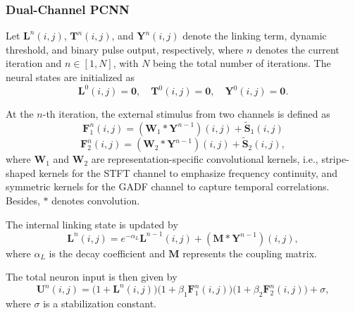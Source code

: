 \documentclass[pdflatex,sn-mathphys-num]{sn-jnl}
\theoremstyle{thmstyleone}%
\theoremstyle{thmstyletwo}%
\theoremstyle{thmstylethree}%
\begin{document}
\subsubsection{Dual-Channel PCNN}

Let $\boldsymbol{L}^n(i,j)$, $\boldsymbol{T}^n(i,j)$, and $\boldsymbol{Y}^n(i,j)$ denote the linking term, dynamic threshold, and binary pulse output, respectively, where $n$ denotes the current iteration and $n \in [1, N]$, with $N$ being the total number of iterations. The neural states are initialized as
\begin{equation}
	\boldsymbol{L}^0(i,j) = \boldsymbol {0}, \quad 
	\boldsymbol{T}^0(i,j) = \boldsymbol {0}, \quad 
	\boldsymbol{Y}^0(i,j) = \boldsymbol {0}.
	\label{eq:initialization}
\end{equation}

At the $n$-th iteration, the external stimulus from two channels is defined as
\begin{equation}
	\boldsymbol{F}_1^n(i,j) = (\boldsymbol{W}_1 * \boldsymbol{Y}^{n-1})(i,j) + \boldsymbol{\tilde{S}}_1(i,j)
	\label{eq:f1_update}
\end{equation}
\begin{equation}
	\boldsymbol{F}_2^n(i,j) = (\boldsymbol{W}_2 * \boldsymbol{Y}^{n-1})(i,j) + \boldsymbol{\tilde{S}}_2(i,j),
	\label{eq:f2_update}
\end{equation}
where $\boldsymbol{W}_1$ and $\boldsymbol{W}_2$ are representation-specific convolutional kernels, i.e., stripe-shaped kernels for the STFT channel to emphasize frequency continuity, and symmetric kernels for the GADF channel to capture temporal correlations. Besides, $*$ denotes convolution.

The internal linking state is updated by
\begin{equation}
	\boldsymbol{L}^n(i,j) = e^{-\alpha_L} \boldsymbol{L}^{n-1}(i,j) + (\boldsymbol{M} * \boldsymbol{Y}^{n-1})(i,j),
	\label{eq:linking_update}
\end{equation}
where $\alpha_L$ is the decay coefficient and $\boldsymbol M$ represents the coupling matrix.

The total neuron input is then given by
\begin{equation}
	\boldsymbol{U}^n(i,j) = \big(1 + \boldsymbol{L}^n(i,j)\big)\Big(1 + \beta_1 \boldsymbol{F}_1^n(i,j)\Big)
	\Big(1 + \beta_2 \boldsymbol{F}_2^n(i,j)\Big) + \sigma,
	\label{eq:internal_activity}
\end{equation}
where $\sigma$ is a stabilization constant.
\end{document}
